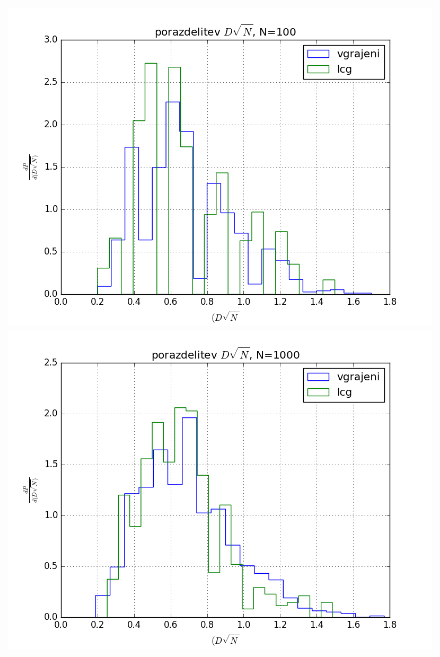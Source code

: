 \documentclass[slovene,11pt,a4paper]{article}
\numberwithin{equation}{section} %
\numberwithin{figure}{section} %
\numberwithin{table}{section} %
\begin{document}
\begin{figure}[h]
\centering
\begin{minipage}{0.5\textwidth}
\centering
\includegraphics[scale=0.4]{slike/potazdelitev_DsqrtN_100.png}
\end{minipage}\hfill
\begin{minipage}{0.5\textwidth}
\centering
\includegraphics[scale=0.4]{slike/potazdelitev_DsqrtN_1000.png}
\end{minipage}
\begin{minipage}{0.5\textwidth}
\centering

\end{minipage}
\end{figure}
\end{document}
